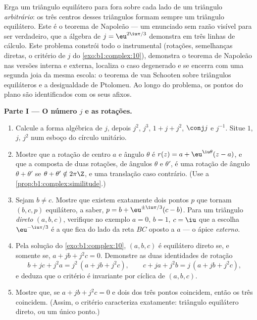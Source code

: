 \begin{problem}\label{pb:b1:complex:1}
Erga um triângulo equilátero para fora sobre cada lado de um triângulo
\emph{arbitrário}: os três centros desses triângulos formam sempre um
triângulo equilátero. Este é o teorema de Napoleão
 --- um enunciado sem razão visível para
ser verdadeiro, que a álgebra de $j = \eu^{2\iu\pi/3}$ demonstra em três
linhas de cálculo. Este problema constrói todo o instrumental
(rotações, semelhanças diretas, o critério de $j$ do
\cref{exo:b1:complex:10}), demonstra o teorema de Napoleão nas versões interna
e externa, localiza o caso degenerado e se encerra com uma segunda joia
da mesma escola: o teorema de van Schooten sobre triângulos equiláteros
e a desigualdade de Ptolomeu. Ao longo do problema, os pontos do plano
são identificados com os seus afixos.

\medskip
\noindent\textbf{Parte I --- O número $j$ e as rotações.}
\begin{enumerate}
  \item Calcule a forma algébrica de $j$, depois $j^2$, $j^3$, $1 + j
        + j^2$, $\conj j$ e $j^{-1}$. Situe $1$, $j$, $j^2$ num
        esboço do círculo unitário.
  \item Mostre que a rotação de centro $a$ e ângulo $\theta$ é
        $r(z) = a + \eu^{\iu\theta}(z - a)$, e que a
        composta de duas rotações, de ângulos $\theta$ e
        $\theta'$, é uma rotação de ângulo $\theta + \theta'$ se
        $\theta + \theta' \notin 2\pi\Z$, e uma translação
        caso contrário. (Use a \cref{prop:b1:complex:similitude}.)
  \item Sejam $b \neq c$. Mostre que existem exatamente dois pontos $p$
        que tornam $(b, c, p)$ equilátero, a saber, $p = b +
        \eu^{\pm\iu\pi/3}(c - b)$. Para um triângulo \emph{direto}
        $(a, b, c)$, verifique no exemplo $a = 0$, $b = 1$, $c =
        \iu$ que a escolha $\eu^{-\iu\pi/3}$ é a que fica do
        lado da reta $BC$ oposto a $a$ --- o ápice
        \emph{externo}.
  \item Pela solução do \cref{exo:b1:complex:10}, $(a, b, c)$
        é equilátero direto se, e somente se, $a + jb + j^2c = 0$. Demonstre as duas
        identidades de rotação
        \[
        b + jc + j^2a = j^2\,(a + jb + j^2c),
        \qquad
        c + ja + j^2b = j\,(a + jb + j^2c),
        \]
        e deduza que o critério é invariante por 
        cíclica de $(a, b, c)$.
  \item Mostre que, se $a + jb + j^2c = 0$ e dois dos três pontos
        coincidem, então os três coincidem. (Assim, o critério
        caracteriza exatamente: triângulo equilátero direto, ou um
        único ponto.)
\end{enumerate}


\end{problem}
